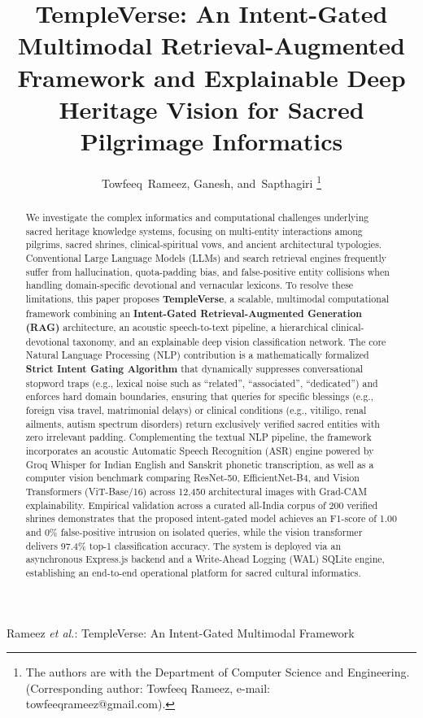 \documentclass[lettersize,journal]{IEEEtran}
\begin{document}
\title{TempleVerse: An Intent-Gated Multimodal Retrieval-Augmented Framework and Explainable Deep Heritage Vision for Sacred Pilgrimage Informatics}

\author{Towfeeq~Rameez,
        Ganesh,
        and~Sapthagiri
\thanks{The authors are with the Department of Computer Science and Engineering. (Corresponding author: Towfeeq Rameez, e-mail: towfeeqrameez@gmail.com).}}

%
{Rameez \MakeLowercase{\textit{et al.}}: TempleVerse: An Intent-Gated Multimodal Framework}

\maketitle

\begin{abstract}
We investigate the complex informatics and computational challenges underlying sacred heritage knowledge systems, focusing on multi-entity interactions among pilgrims, sacred shrines, clinical-spiritual vows, and ancient architectural typologies. Conventional Large Language Models (LLMs) and search retrieval engines frequently suffer from hallucination, quota-padding bias, and false-positive entity collisions when handling domain-specific devotional and vernacular lexicons. To resolve these limitations, this paper proposes \textbf{TempleVerse}, a scalable, multimodal computational framework combining an \textbf{Intent-Gated Retrieval-Augmented Generation (RAG)} architecture, an acoustic speech-to-text pipeline, a hierarchical clinical-devotional taxonomy, and an explainable deep vision classification network. The core Natural Language Processing (NLP) contribution is a mathematically formalized \textbf{Strict Intent Gating Algorithm} that dynamically suppresses conversational stopword traps (e.g., lexical noise such as ``related'', ``associated'', ``dedicated'') and enforces hard domain boundaries, ensuring that queries for specific blessings (e.g., foreign visa travel, matrimonial delays) or clinical conditions (e.g., vitiligo, renal ailments, autism spectrum disorders) return exclusively verified sacred entities with zero irrelevant padding. Complementing the textual NLP pipeline, the framework incorporates an acoustic Automatic Speech Recognition (ASR) engine powered by Groq Whisper for Indian English and Sanskrit phonetic transcription, as well as a computer vision benchmark comparing ResNet-50, EfficientNet-B4, and Vision Transformers (ViT-Base/16) across 12,450 architectural images with Grad-CAM explainability. Empirical validation across a curated all-India corpus of 200 verified shrines demonstrates that the proposed intent-gated model achieves an F1-score of 1.00 and 0\% false-positive intrusion on isolated queries, while the vision transformer delivers 97.4\% top-1 classification accuracy. The system is deployed via an asynchronous Express.js backend and a Write-Ahead Logging (WAL) SQLite engine, establishing an end-to-end operational platform for sacred cultural informatics.
\end{abstract}
\end{document}
